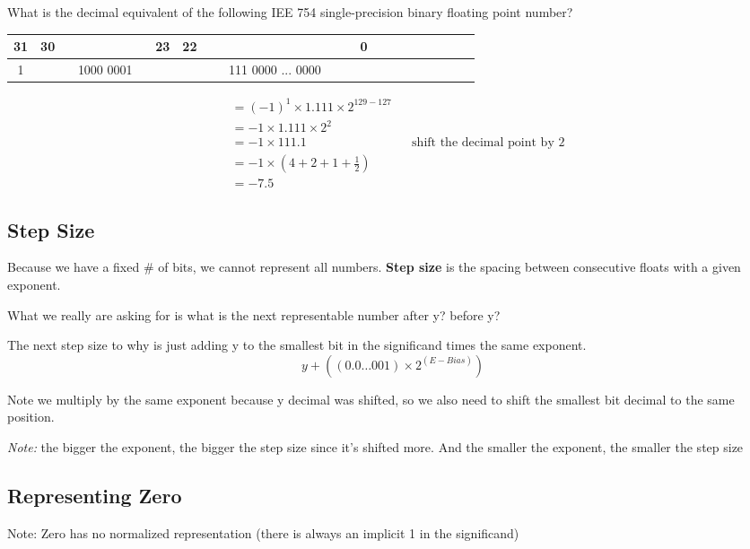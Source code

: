 \documentclass[12pt]{article}
\begin{document}
\begin{example}
    What is the decimal equivalent of the following IEE 754 single-precision binary floating point number?
    \begin{center}
        \begin{tabular}{|*{32}{c}}
            \hline
            31                      & 30                             &                                         &  &  &  &  &  &  & 23 & 22 &  &  &  &  &  &  &  &  &  &  &  &  & \multicolumn{1}{c|}{0} \\ \hline

            \multicolumn{1}{|c|}{1} & \multicolumn{9}{c|}{1000 0001} & \multicolumn{14}{c|}{111 0000 ... 0000}                                                                                          \\ \hline
        \end{tabular}
    \end{center}

    \begin{align}
         & = (-1)^1 \times 1.111 \times 2^{129 - 127}                                          \\
         & = -1 \times 1.111 \times 2^{2}                                                      \\
         & = -1 \times 111.1                          &  & \text{shift the decimal point by 2} \\
         & = -1 \times (4 + 2 + 1 + \frac{1}{2})                                               \\
         & =  -7.5
    \end{align}
\end{example}

\subsection*{Step Size}
Because we have a fixed \# of bits, we cannot represent all numbers. \textbf{Step size} is the spacing between consecutive floats with a given exponent.

What we really are asking for is what is the next representable number after y? before y?

The next step size to why is just adding y to the smallest bit in the significand times the same exponent.
$$
    y + ((0.0\dots001) \times 2^{(E - Bias)})
$$

Note we multiply by the same exponent because y decimal was shifted, so we also need to shift the smallest bit decimal to the same position.

\emph{Note:} the bigger the exponent, the bigger the step size since it's shifted more.
And the smaller the exponent, the smaller the step size


\subsection*{Representing Zero}
Note: Zero has no normalized representation (there is always an implicit 1 in the significand)
\end{document}
